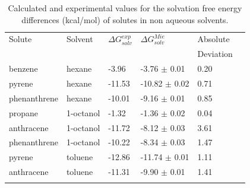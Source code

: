 \begin{table}[h]
\centering
  \caption{Calculated and experimental values for the solvation free energy differences (kcal/mol) of solutes in non aqueous solvents.}
  \label{tbl:solv1}
  \begin{tabular}{llllll}
  	\hline\hline
  	 Solute       &Solvent   & $\Delta G_{solv}^{exp}$ & $\Delta G_{solv}^{Mie}$ & Absolute  \\
  	              &          &                         &                         & Deviation \\ \hline
  	 benzene      &hexane    & -3.96                   & -3.76  $\pm$ 0.01       & 0.20      \\
  	 pyrene       &hexane    & -11.53                  & -10.82 $\pm$ 0.02       & 0.71      \\
  	 phenanthrene &hexane    & -10.01                  & -9.16  $\pm$ 0.01       & 0.85      \\
  	 propane      &1-octanol & -1.32                   & -1.36  $\pm$ 0.02       & 0.04      \\
  	 anthracene   &1-octanol & -11.72                  & -8.12  $\pm$ 0.03       & 3.61      \\
  	 phenanthrene &1-octanol & -10.22                  & -8.34  $\pm$ 0.03       & 1.47      \\
  	 pyrene       &toluene   & -12.86                  & -11.74 $\pm$ 0.01       & 1.11      \\
  	 anthracene   &toluene   & -11.31                  & -9.90 $\pm$ 0.01        & 1.41      \\
\hline\hline& 
  \end{tabular}
\end{table}
\FloatBarrier

